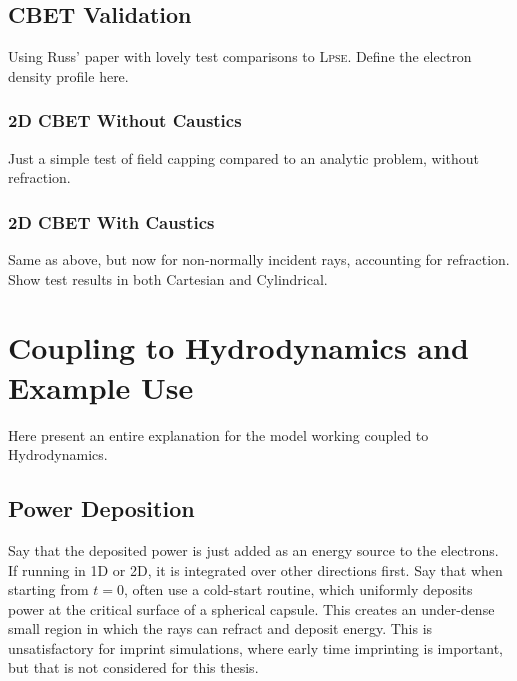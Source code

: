 \subsection{\ac{CBET} Validation}
Using Russ' paper with lovely test comparisons to \textsc{Lpse}.
Define the electron density profile here.

\subsubsection{2D \ac{CBET} Without Caustics}
Just a simple test of field capping compared to an analytic problem, without refraction.

\subsubsection{2D \ac{CBET} With Caustics}
\label{sec:SOLAS_CBET_caustic_test}
Same as above, but now for non-normally incident rays, accounting for refraction.
Show test results in both Cartesian and Cylindrical.


\section{Coupling to Hydrodynamics and Example Use}

Here present an entire explanation for the model working coupled to Hydrodynamics.

\subsection{Power Deposition}

Say that the deposited power is just added as an energy source to the electrons.
If running in 1D or 2D, it is integrated over other directions first.
Say that when starting from $t=0$, often use a cold-start routine, which uniformly deposits power at the critical surface of a spherical capsule.
This creates an under-dense small region in which the rays can refract and deposit energy.
This is unsatisfactory for imprint simulations, where early time imprinting is important, but that is not considered for this thesis.

